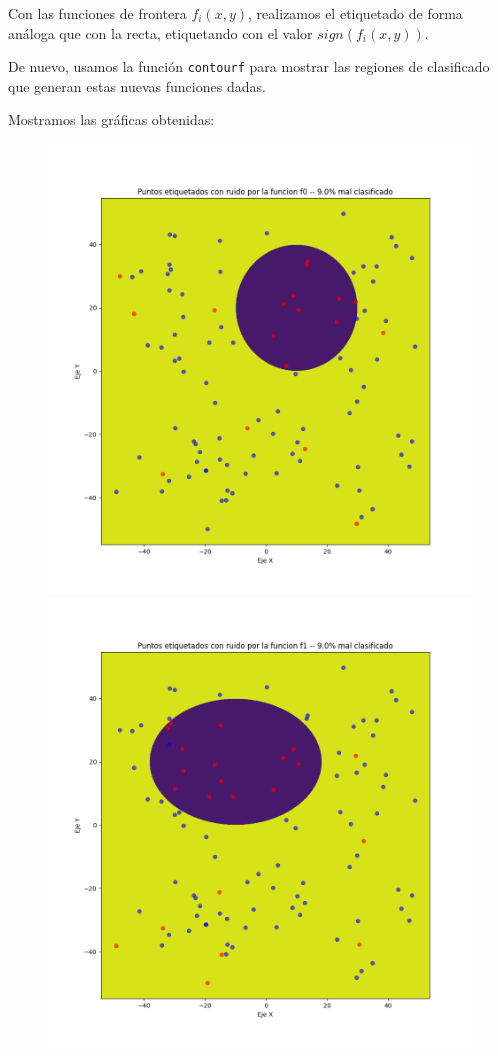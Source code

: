 \documentclass[11pt]{article}
\begin{document}
Con las funciones de frontera $f_i(x, y)$, realizamos el etiquetado de forma análoga que con la recta, etiquetando con el valor $sign(f_i(x,y))$.

De nuevo, usamos la función \lstinline{contourf} para mostrar las regiones de clasificado que generan estas nuevas funciones dadas.

Mostramos las gráficas obtenidas:

\begin{figure}[H]
    \includegraphics[width=0.60 \textwidth]{puntos_clasificados_experimento_f0.png}
    \includegraphics[width=0.60 \textwidth]{puntos_clasificados_experimento_f1.png}


\end{figure}
\end{document}
